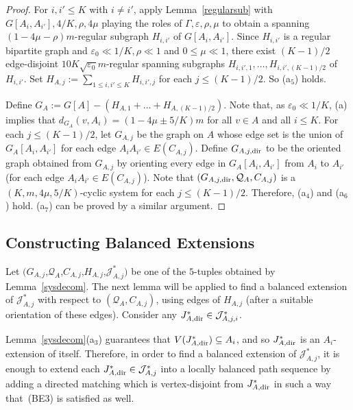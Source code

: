 \documentclass{memo-l}
\def\COMMENT#1{}
\def\eps{\varepsilon}
\def\epszero{\eps_0}
\numberwithin{section}{chapter}
\numberwithin{equation}{section}
\numberwithin{firstthm}{section}
\numberwithin{figure}{section}
\begin{document}
{\begin{proof}
For $i,i' \le K$ with $i \ne i'$, apply Lemma~\ref{regularsub} with $G[A_i,A_{i'}], 4/K, \rho, 4\mu$ playing the roles of $\Gamma, \eps, \rho, \mu$
to obtain a spanning $(1- 4 \mu - \rho)m$-regular subgraph $H_{i,i'}$ of $G[A_i,A_{i'}]$.
Since $H_{i,i'}$ is a regular bipartite graph and $\epszero \ll 1/K , \rho \ll 1$ and $0 \le \mu \ll 1$,
there exist $(K-1)/2$ edge-disjoint $10K \sqrt{ \epszero } m$-regular spanning subgraphs $H_{i,i',1}, \dots, H_{i,i',(K-1)/2}$ of $H_{i,i'}$.
Set $H_{A,j} := \sum_{1 \le i, i' \le K} H_{i,i',j}$ for each $j \le (K-1)/2$. So (a$_5$) holds.

Define $G_A:=G[A]-(H_{A,1}+\dots+H_{A,(K-1)/2})$.
Note that, as $\eps_0 \ll 1/K$, (a) implies that $d_{G_A}(v,A_i) = (1 - 4 \mu \pm 5 /K) m $ for all $v \in A$ and all $i \le K$.
For each $j \le (K-1)/2$, let $G_{A,j}$ be the graph on $A$ whose edge set is the union of $G_A[A_{i},A_{i'}]$ for each edge $A_iA_{i'} \in E(C_{A,j})$.
Define $G_{A,j, {\rm dir}}$ to be the oriented graph obtained from $G_{A,j}$ by orienting every edge in $G_A[A_{i},A_{i'}]$ from $A_i$ to $A_{i'}$
(for each edge $A_iA_{i'} \in E(C_{A,j})$).
Note that $ ( G_{A,j, {\rm dir}}, \mathcal{Q}_A, C_{A,j})$ is a $(K,m, 4\mu, 5/K) $-cyclic system for each $j \le (K-1)/2$.
Therefore, (a$_4$) and (a$_6$) hold. (a$_7$) can be proved by a similar argument.
\end{proof}



\subsection{Constructing Balanced Extensions} \label{sec:BE2clique}

Let $(G_{A,j}$,$\mathcal{Q}_A$,$C_{A,j}$,$H_{A,j}$,$\mathcal{J}^*_{A,j})$ be one of the $5$-tuples obtained by Lemma~\ref{sysdecom}.
The next lemma will be applied to find a balanced extension of $\mathcal{J}^*_{A,j}$ with respect to $(\mathcal{Q}_A,C_{A,j})$,
using edges of $H_{A,j}$ (after a suitable orientation of these edges).
Consider any $J^*_{A, {\rm dir}} \in \mathcal{J}^*_{A,j,i}$.%
   \COMMENT{Daniela: changed $\mathcal{J}^*_{A,j}$ to $\mathcal{J}^*_{A,j,i}$}
Lemma~\ref{sysdecom}(a$_3$) guarantees that
$V(J^*_{A, {\rm dir}}) \subseteq A_i$, and so $J^*_{A, {\rm dir}}$ is an $A_i$-extension of itself.
Therefore, in order to find a balanced extension of $\mathcal{J}^*_{A,j}$, it is enough to extend each $J^*_{A, {\rm dir}} \in \mathcal{J}^*_{A,j}$
into a locally balanced path sequence by adding a directed matching which is vertex-disjoint from $J^*_{A, {\rm dir}}$ in such a way that~(BE3)
is satisfied as well.

}
\end{document}
